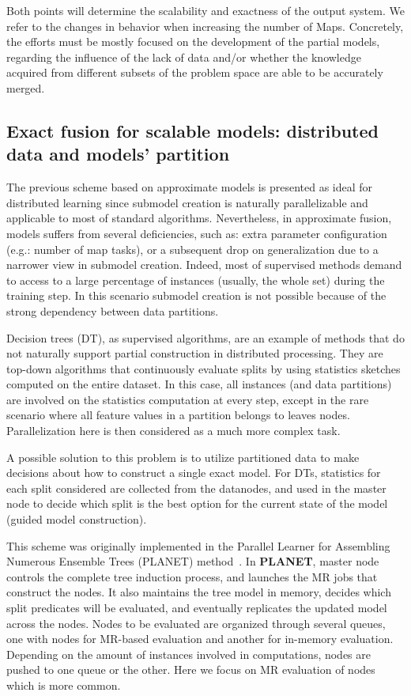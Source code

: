 \documentclass[3p,review]{elsarticle}
\begin{document}
Both points will determine the scalability and exactness of the output system. We refer to the changes in behavior when increasing the number of Maps. Concretely, the efforts must be mostly focused on the development of the partial models, regarding the influence of the lack of data and/or whether the knowledge acquired from different subsets of the problem space are able to be accurately merged.

\subsection{Exact fusion for scalable models: distributed data and models' partition}\label{subsec:exact}

The previous scheme based on approximate models is presented as ideal for distributed learning since submodel creation is naturally parallelizable and applicable to most of standard algorithms. Nevertheless, in approximate fusion, models suffers from several deficiencies, such as: extra parameter configuration (e.g.: number of map tasks), or a subsequent drop on generalization due to a narrower view in submodel creation. Indeed, most of supervised methods demand to access to a large percentage of instances (usually, the whole set) during the training step. In this scenario submodel creation is not possible because of the strong dependency between data partitions. 

Decision trees (DT), as supervised algorithms, are an example of methods that do not naturally support partial construction in distributed processing. They are top-down algorithms that continuously evaluate splits by using statistics sketches computed on the entire dataset. In this case, all instances (and data partitions) are involved on the statistics computation at every step, except in the rare scenario where all feature values in a partition belongs to leaves nodes. Parallelization here is then considered as a much more complex task.

A possible solution to this problem is to utilize partitioned data to make decisions about how to construct a single exact model. For DTs, statistics for each split considered are collected from the datanodes, and used in the master node to decide which split is the best option for the current state of the model (guided model construction).

This scheme was originally implemented in the Parallel Learner for Assembling Numerous Ensemble Trees (PLANET) method~\cite{panda09}. In \textbf{PLANET}, master node controls the complete tree induction process, and launches the MR jobs that construct the nodes. It also maintains the tree model in memory, decides which split predicates will be evaluated, and eventually replicates the updated model across the nodes. Nodes to be evaluated are organized through several queues, one with nodes for MR-based evaluation and another for in-memory evaluation. Depending on the amount of instances involved in computations, nodes are pushed to one queue or the other. Here we focus on MR evaluation of nodes which is more common.
\end{document}
